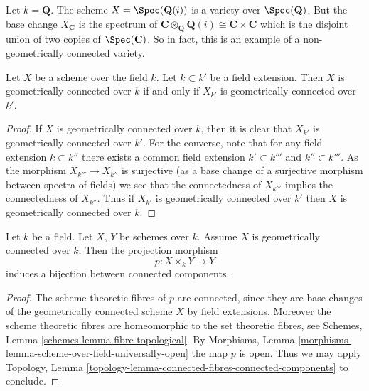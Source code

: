 \begin{example}
\label{example-not-geometrically-irreducible}
Let $k = \mathbf{Q}$. The scheme
$X = \Spec(\mathbf{Q}(i))$ is a variety over $\Spec(\mathbf{Q})$.
But the base change $X_{\mathbf{C}}$ is the spectrum of
$\mathbf{C} \otimes_{\mathbf{Q}} \mathbf{Q}(i) \cong
\mathbf{C} \times \mathbf{C}$ which is the disjoint union of
two copies of $\Spec(\mathbf{C})$. So in fact, this is an
example of a non-geometrically connected variety.
\end{example}

\begin{lemma}
\label{lemma-geometrically-connected-check-after-extension}
Let $X$ be a scheme over the field $k$.
Let $k \subset k'$ be a field extension.
Then $X$ is geometrically connected over $k$ if and only if
$X_{k'}$ is geometrically connected over $k'$.
\end{lemma}

\begin{proof}
If $X$ is geometrically connected over $k$, then it is clear that
$X_{k'}$ is geometrically connected over $k'$. For the converse, note
that for any field extension $k \subset k''$ there exists a common
field extension $k' \subset k'''$ and $k'' \subset k'''$. As the
morphism $X_{k'''} \to X_{k''}$ is surjective (as a base change of
a surjective morphism between spectra of fields) we see that the
connectedness of $X_{k'''}$ implies the connectedness of $X_{k''}$.
Thus if $X_{k'}$ is geometrically connected over $k'$ then
$X$ is geometrically connected over $k$.
\end{proof}

\begin{lemma}
\label{lemma-bijection-connected-components}
Let $k$ be a field.
Let $X$, $Y$ be schemes over $k$.
Assume $X$ is geometrically connected over $k$.
Then the projection morphism
$$
p : X \times_k Y \longrightarrow Y
$$
induces a bijection between connected components.
\end{lemma}

\begin{proof}
The scheme theoretic fibres of $p$ are connected, since they
are base changes of the geometrically connected scheme $X$ by
field extensions. Moreover the scheme theoretic fibres are
homeomorphic to the set theoretic fibres, see
Schemes, Lemma \ref{schemes-lemma-fibre-topological}.
By
Morphisms, Lemma \ref{morphisms-lemma-scheme-over-field-universally-open}
the map $p$ is open.
Thus we may apply Topology,
Lemma \ref{topology-lemma-connected-fibres-connected-components}
to conclude.
\end{proof}

